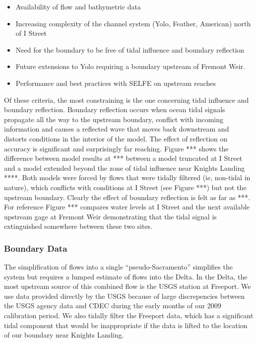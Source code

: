 \begin{itemize}
	\item Availability of flow and bathymetric data
	\item Increasing complexity of the channel system (Yolo, Feather, American) north of I Street
	\item Need for the boundary to be free of tidal influence and boundary reflection
	\item Future extensions to Yolo requiring a boundary upstream of Fremont Weir.
	\item Performance and best practices with SELFE on upstream reaches
\end{itemize}

Of these criteria, the most constraining is the one concerning tidal influence and boundary reflection. Boundary reflection occurs when ocean tidal signals propagate all the way to the upstream boundary, conflict with incoming information and causes a reflected wave that moves back downstream and distorts conditions in the interior of the model. The effect of reflection on accuracy is significant and surprisingly far reaching. Figure *** shows the difference between model results at *** between a model truncated at I Street and a model extended beyond the zone of tidal influence near Knights Landing ****. Both models were forced by flows that were tidally filtered (ie, non-tidal in nature), which conflicts with conditions at I Street (see Figure ***) but not the upstream boundary. Clearly the effect of boundary reflection is felt as far as ***. For reference Figure *** compares water levels at I Street and the next available upstream gage at Fremont Weir demonstrating that the tidal signal is extinguished somewhere between these two sites.
 
\subsubsection{Boundary Data}

The simplification of flows into a single "`pseudo-Sacramento"' simplifies the system but requires a lumped estimate of flows into the Delta. In the Delta, the most upstream source of this combined flow is the USGS station at Freeport. We use data provided directly by the USGS because of large discrepencies between the USGS agency data and CDEC during the early months of our 2009 calibration period.  We also tidally filter the Freeport data, which has a significant tidal component that would be inappropriate if the data is lifted to the location of our boundary near Knights Landing. 

